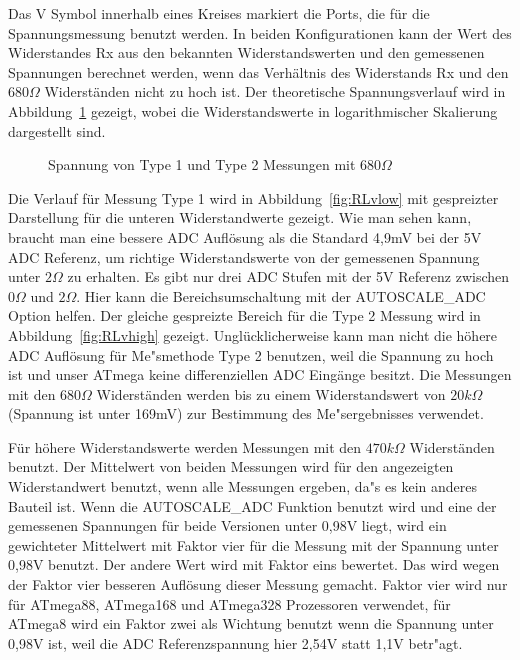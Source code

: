 Das V Symbol innerhalb eines Kreises markiert die Ports, die f\"ur die Spannungsmessung benutzt werden.
In beiden Konfigurationen kann der Wert des Widerstandes Rx aus den bekannten Widerstandswerten
und den gemessenen Spannungen berechnet werden, wenn das Verh\"altnis des Widerstands Rx und den \(680\Omega\) Widerst\"anden
 nicht zu hoch ist.
Der theoretische Spannungsverlauf wird in Abbildung~\ref{fig:RLvtot} gezeigt, wobei die Widerstandswerte 
in logarithmischer Skalierung dargestellt sind.
\begin{figure}[H]
\centering

\caption{Spannung von Type 1 und Type 2 Messungen mit \(680\Omega\) }
\label{fig:RLvtot}
\end{figure}
Die Verlauf f\"ur Messung Type 1 wird in Abbildung~\ref{fig:RLvlow} mit gespreizter Darstellung f\"ur die unteren Widerstandwerte gezeigt.
Wie man sehen kann, braucht man eine bessere ADC Aufl\"osung als die Standard 4,9mV bei der 5V ADC Referenz, um richtige
Widerstandswerte von der gemessenen Spannung unter \(2\Omega\) zu erhalten.
Es gibt nur drei ADC Stufen mit der 5V Referenz zwischen \(0\Omega\) und \(2\Omega\).
Hier kann die Bereichsumschaltung mit der AUTOSCALE\_ADC Option helfen.
Der gleiche gespreizte Bereich f\"ur die Type 2 Messung wird in Abbildung~\ref{fig:RLvhigh} gezeigt.
Ungl\"ucklicherweise kann man nicht die h\"ohere ADC Aufl\"osung f\"ur Me"smethode Type 2 benutzen,
weil die Spannung zu hoch ist und unser ATmega keine differenziellen ADC Eing\"ange besitzt.
Die Messungen mit den \(680\Omega\) Widerst\"anden werden bis zu einem Widerstandswert von 
\(20k\Omega\) (Spannung ist unter 169mV) zur Bestimmung des Me"sergebnisses verwendet.

F\"ur h\"ohere Widerstandswerte werden Messungen mit den \(470k\Omega\) Widerst\"anden benutzt.
Der Mittelwert von beiden Messungen wird f\"ur den angezeigten Widerstandwert benutzt, wenn alle Messungen ergeben,
da"s es kein anderes Bauteil ist.
Wenn die AUTOSCALE\_ADC Funktion benutzt wird und eine der gemessenen Spannungen f\"ur beide Versionen unter 0,98V liegt,
wird ein gewichteter Mittelwert mit Faktor vier f\"ur die Messung mit der Spannung unter 0,98V benutzt. Der andere Wert wird mit Faktor eins bewertet.
Das wird wegen der Faktor vier besseren Aufl\"osung dieser Messung gemacht.
Faktor vier wird nur f\"ur ATmega88, ATmega168 und ATmega328 Prozessoren verwendet, f\"ur ATmega8 wird ein
Faktor zwei als Wichtung benutzt wenn die Spannung unter 0,98V ist, weil die ADC Referenzspannung hier 2,54V statt 1,1V betr"agt.

